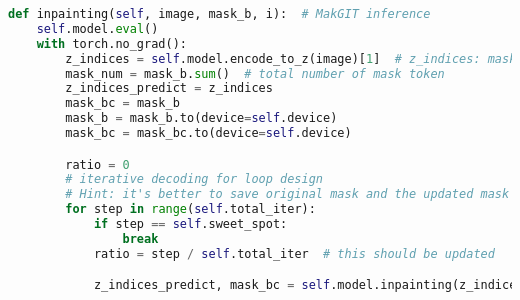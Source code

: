 \begin{lstlisting}[language=Python, caption=inpainting.py: MaskGIT.inpainting]
def inpainting(self, image, mask_b, i):  # MakGIT inference
    self.model.eval()
    with torch.no_grad():
        z_indices = self.model.encode_to_z(image)[1]  # z_indices: masked tokens (b,16*16)
        mask_num = mask_b.sum()  # total number of mask token
        z_indices_predict = z_indices
        mask_bc = mask_b
        mask_b = mask_b.to(device=self.device)
        mask_bc = mask_bc.to(device=self.device)

        ratio = 0
        # iterative decoding for loop design
        # Hint: it's better to save original mask and the updated mask by scheduling separately
        for step in range(self.total_iter):
            if step == self.sweet_spot:
                break
            ratio = step / self.total_iter  # this should be updated

            z_indices_predict, mask_bc = self.model.inpainting(z_indices_predict, mask_bc, mask_num, ratio)
\end{lstlisting}


